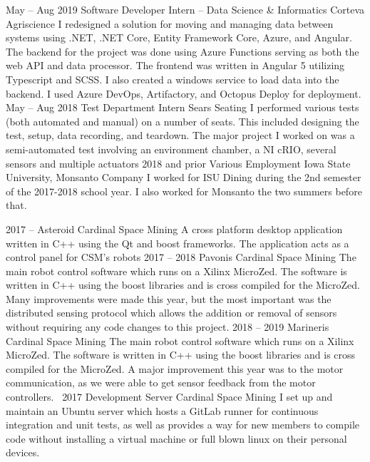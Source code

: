 \documentclass[9pt]{developercv} %
\begin{document}
\begin{entrylist}
	\entry
		{May -- Aug 2019}
		{Software Developer Intern -- Data Science \& Informatics}
		{Corteva Agriscience}
		{I redesigned a solution for moving and managing data between systems using .NET, .NET Core, Entity Framework Core, Azure, and Angular. The backend for the project was done using Azure Functions serving as both the web API and data processor. The frontend was written in Angular 5 utilizing Typescript and SCSS. I also created a windows service to load data into the backend. I used Azure DevOps, Artifactory, and Octopus Deploy for deployment.}
	\entry
		{May -- Aug 2018}
		{Test Department Intern}
		{Sears Seating}
		{I performed various tests (both automated and manual) on a number of seats.  This included designing the test, setup, data recording, and teardown.  The major project I worked on was a semi-automated test involving an environment chamber, a NI cRIO, several sensors and multiple actuators}
	\entry
		{2018 and prior}
		{Various Employment}
		{Iowa State University, Monsanto Company}
		{I worked for ISU Dining during the 2nd semester of the 2017-2018 school year.  I also worked for Monsanto the two summers before that.}
\end{entrylist}


\begin{entrylist}
	\entry
		{2017 --}
		{Asteroid}
		{Cardinal Space Mining}
		{A cross platform desktop application written in C++ using the Qt and boost frameworks.  The application acts as a control panel for CSM's robots}
	\entry
		{2017 -- 2018}
		{Pavonis}
		{Cardinal Space Mining}
		{The main robot control software which runs on a Xilinx MicroZed.  The software is written in C++ using the boost libraries and is cross compiled for the MicroZed.  Many improvements were made this year, but the most important was the distributed sensing protocol which allows the addition or removal of sensors without requiring any code changes to this project.}
	\entry
		{2018 -- 2019}
		{Marineris}
		{Cardinal Space Mining}
		{The main robot control software which runs on a Xilinx MicroZed.  The software is written in C++ using the boost libraries and is cross compiled for the MicroZed.  A major improvement this year was to the motor communication, as we were able to get sensor feedback from the motor controllers.}\
	\entry
		{2017}
		{Development Server}
		{Cardinal Space Mining}
		{I set up and maintain an Ubuntu server which hosts a GitLab runner for continuous integration and unit tests, as well as provides a way for new members to compile code without installing a virtual machine or full blown linux on their personal devices.}
\end{entrylist}
\end{document}
